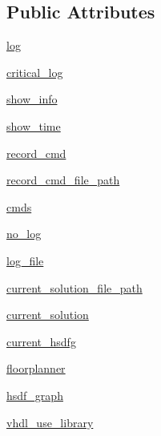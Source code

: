 \subsection*{Public Attributes}
\begin{DoxyCompactItemize}
\item 
\hyperlink{classsylva_1_1misc_1_1exec_1_1_s_y_l_v_a_af18d1d94d1cd253fdd82470d0fd2d8b9}{log}
\item 
\hyperlink{classsylva_1_1misc_1_1exec_1_1_s_y_l_v_a_affd12ed0af4dc9661dbb48cc7257fae7}{critical\+\_\+log}
\item 
\hyperlink{classsylva_1_1misc_1_1exec_1_1_s_y_l_v_a_a9a267f9d05fa98ca49fbfc5e049184a1}{show\+\_\+info}
\item 
\hyperlink{classsylva_1_1misc_1_1exec_1_1_s_y_l_v_a_a9b9a7b62a11ddea03dc98a441e0cfb0a}{show\+\_\+time}
\item 
\hyperlink{classsylva_1_1misc_1_1exec_1_1_s_y_l_v_a_afca36696c160ab349df57221283ac5ca}{record\+\_\+cmd}
\item 
\hyperlink{classsylva_1_1misc_1_1exec_1_1_s_y_l_v_a_a88d289f3e8cebe556cc7995c24fc7e21}{record\+\_\+cmd\+\_\+file\+\_\+path}
\item 
\hyperlink{classsylva_1_1misc_1_1exec_1_1_s_y_l_v_a_a86d2cf84dd00495fbaf03c3fa73f7d2a}{cmds}
\item 
\hyperlink{classsylva_1_1misc_1_1exec_1_1_s_y_l_v_a_a4ce3a2f4a4bc39adf1cf5f40830e5a83}{no\+\_\+log}
\item 
\hyperlink{classsylva_1_1misc_1_1exec_1_1_s_y_l_v_a_a0a00f9025fed04a0b679266e162d920a}{log\+\_\+file}
\item 
\hyperlink{classsylva_1_1misc_1_1exec_1_1_s_y_l_v_a_aaa1302cb6228300236cc5247772cb217}{current\+\_\+solution\+\_\+file\+\_\+path}
\item 
\hyperlink{classsylva_1_1misc_1_1exec_1_1_s_y_l_v_a_a82c1097a688d7aa3f8230e5a15f04f57}{current\+\_\+solution}
\item 
\hyperlink{classsylva_1_1misc_1_1exec_1_1_s_y_l_v_a_ade537fbc4e703bbc2e390ab859a3105b}{current\+\_\+hsdfg}
\item 
\hyperlink{classsylva_1_1misc_1_1exec_1_1_s_y_l_v_a_a0aecbe66313e187f42854465742fcd99}{floorplanner}
\item 
\hyperlink{classsylva_1_1misc_1_1exec_1_1_s_y_l_v_a_a28c35ccef899db163e488742450c669f}{hsdf\+\_\+graph}
\item 
\hyperlink{classsylva_1_1misc_1_1exec_1_1_s_y_l_v_a_af39a0e981697bb8ef909adea5bdaa07d}{vhdl\+\_\+use\+\_\+library}
\item 

\end{DoxyCompactItemize}
